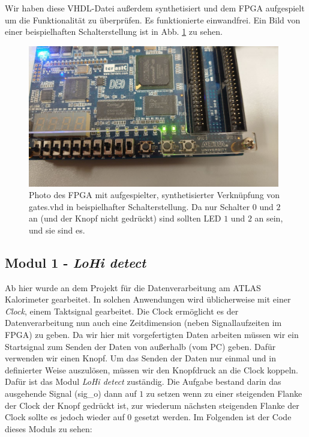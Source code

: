 Wir haben diese VHDL-Datei außerdem synthetisiert und dem FPGA aufgespielt um die Funktionalität zu überprüfen.
Es funktionierte einwandfrei.
Ein Bild von einer beispielhaften Schalterstellung ist in Abb. \ref{photo_gates} zu sehen.

\begin{figure}[ht]
	\centering
    \includegraphics[width=0.98\textwidth]{../Daten/Photo_FPGA_gates.png}
	\caption{Photo des FPGA mit aufgespielter, synthetisierter Verknüpfung von gates.vhd in beispielhafter Schalterstellung. Da nur Schalter $0$ und $2$ an (und der Knopf nicht gedrückt) sind sollten LED $1$ und $2$ an sein, und sie sind es.}
	\label{photo_gates}
\end{figure}

\subsection{Modul 1 - \textit{LoHi detect}}

Ab hier wurde an dem Projekt für die Datenverarbeitung am ATLAS Kalorimeter gearbeitet.
In solchen Anwendungen wird üblicherweise mit einer \textit{Clock}, einem Taktsignal gearbeitet.
Die Clock ermöglicht es der Datenverarbeitung nun auch eine Zeitdimension (neben Signallaufzeiten im FPGA) zu geben.
Da wir hier mit vorgefertigten Daten arbeiten müssen wir ein Startsignal zum Senden der Daten von außerhalb (vom PC) geben.
Dafür verwenden wir einen Knopf.
Um das Senden der Daten nur einmal und in definierter Weise auszulösen, müssen wir den Knopfdruck an die Clock koppeln.
Dafür ist das Modul \textit{LoHi detect} zuständig.
Die Aufgabe bestand darin das ausgehende Signal (sig\_o) dann auf $1$ zu setzen wenn zu einer steigenden Flanke der Clock der Knopf gedrückt ist, zur wiederum nächsten steigenden Flanke der Clock sollte es jedoch wieder auf $0$ gesetzt werden.
Im Folgenden ist der Code dieses Moduls zu sehen:

